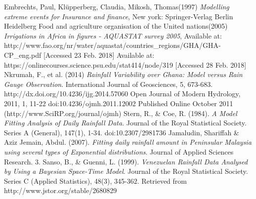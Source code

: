 \documentclass{article}
\begin{document}
	\begin{thebibliography}{1}
		Embrechts, Paul, Kl\"{u}pperberg, Claudia, Mikosh, Thomas(1997)
		\textit{Modelling extreme events for Insurance and finance},
		New york: Springer-Verlag Berlin Heidelberg
		Food and agriculture organisation of the United nations(2005) \textit{Irrigations in Africa in figures - AQUASTAT survey 2005}, Available at: http://www.fao.org/nr/water/aquastat/countries\_regions/GHA/GHA-CP\_eng.pdf [Accessed 23 Feb. 2018]
		Available at:
		https://onlinecourses.science.psu.edu/stat414/node/319 [Accessed 28 Feb. 2018]
		Nkrumah, F., et al. (2014)\textit{ Rainfall Variability over Ghana: Model versus Rain Gauge Observation}. International Journal of Geosciences, 5, 673-683. http://dx.doi.org/10.4236/ijg.2014.57060
		Open Journal of Modern Hydrology, 2011, 1, 11-22
		doi:10.4236/ojmh.2011.12002 Published Online October 2011 (http://www.SciRP.org/journal/ojmh)
		Stern, R., \& Coe, R. (1984). \textit{A Model Fitting Analysis of Daily Rainfall Data}. Journal of the Royal Statistical Society. Series A (General), 147(1), 1-34. doi:10.2307/2981736
		Jamaludin, Shariffah \& Aziz Jemain, Abdul. (2007).\textit{ Fitting daily rainfall amount in Peninsular Malaysia using several types of Exponential distributions}. Journal of Applied Sciences Research. 3. 
		Sanso, B., \& Guenni, L. (1999). \textit{Venezuelan Rainfall Data Analysed by Using a Bayesian Space-Time Model}. Journal of the Royal Statistical Society. Series C (Applied Statistics), 48(3), 345-362. Retrieved from http://www.jstor.org/stable/2680829
	\end{thebibliography}
\end{document}
